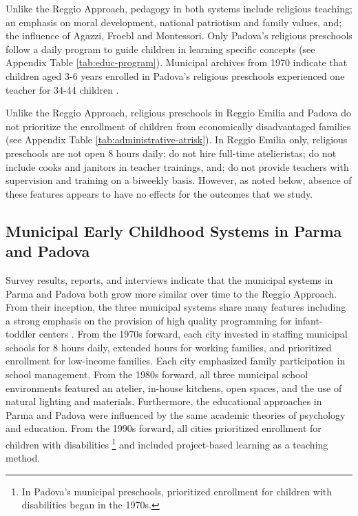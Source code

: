 Unlike the Reggio Approach, pedagogy in both systems include religious teaching; an emphasis on moral development, national patriotism and family values, and; the influence of Agazzi, Froebl and Montessori. Only Padova's religious preschools follow a daily program to guide children in learning specific concepts (see Appendix Table \ref{tab:educ-program}). Municipal archives from 1970 indicate that children aged 3-6 years enrolled in Padova's religious preschools experienced one teacher for 34-44 children \citep{Padova-Admin-Data_1964-2011}.

Unlike the Reggio Approach, religious preschools in Reggio Emilia and Padova do not prioritize the enrollment of children from economically disadvantaged families (see Appendix Table \ref{tab:administrative-atrisk}).  In Reggio Emilia only, religious preschools are not open 8 hours daily; do not hire full-time atelieristas; do not include cooks and janitors in teacher trainings, and; do not provide teachers with supervision and training on a biweekly basis. However, as noted below, absence of these features appears to have no effects for the outcomes that we study.

\subsection{Municipal Early Childhood Systems in Parma and Padova}

Survey results, reports, and interviews indicate that the municipal systems in Parma and Padova both grow more similar over time to the Reggio Approach. From their inception, the three municipal systems share many features including a strong emphasis on the provision of high quality programming for infant-toddler centers \citep{Ghedini_2001_Ital-Natl-Policy}. From the 1970s forward, each city invested in staffing municipal schools for 8 hours daily, extended hours for working families, and prioritized enrollment for low-income families. Each city emphasized family participation in school management. From the 1980s forward, all three municipal school environments featured an atelier, in-house kitchens, open spaces, and the use of natural lighting and materials. Furthermore, the educational approaches in Parma and Padova were influenced by the same academic theories of psychology and education. From the 1990s forward, all cities prioritized enrollment for children with disabilities \footnote{In Padova's municipal preschools, prioritized enrollment for children with disabilities began in the 1970s.} and included project-based learning as a teaching method.


